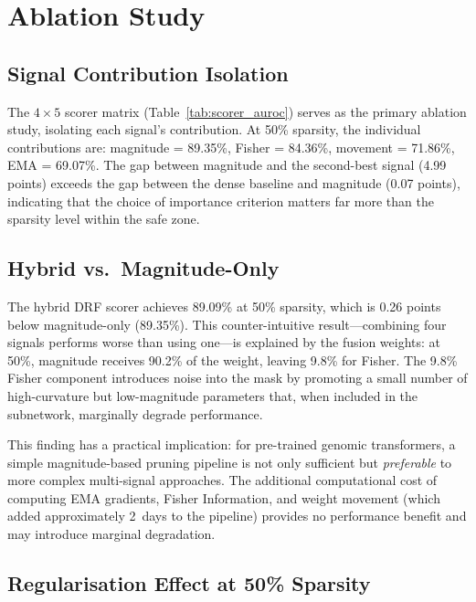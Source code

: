 \documentclass[journal]{IEEEtran}
\begin{document}
\section{Ablation Study}
\label{sec:ablation}

\subsection{Signal Contribution Isolation}

The $4 \times 5$ scorer matrix (Table~\ref{tab:scorer_auroc})
serves as the primary ablation study, isolating each signal's
contribution.
At 50\% sparsity, the individual contributions are:
magnitude = 89.35\%, Fisher = 84.36\%,
movement = 71.86\%, EMA = 69.07\%.
The gap between magnitude and the second-best signal (4.99
points) exceeds the gap between the dense baseline and
magnitude (0.07 points), indicating that the choice of
importance criterion matters far more than the sparsity level
within the safe zone.

\subsection{Hybrid vs.\ Magnitude-Only}

The hybrid DRF scorer achieves 89.09\% at 50\% sparsity,
which is 0.26 points below magnitude-only (89.35\%).
This counter-intuitive result---combining four signals
performs worse than using one---is explained by the fusion
weights: at 50\%, magnitude receives 90.2\% of the weight,
leaving 9.8\% for Fisher.
The 9.8\% Fisher component introduces noise into the mask
by promoting a small number of high-curvature but
low-magnitude parameters that, when included in the
subnetwork, marginally degrade performance.

This finding has a practical implication: for pre-trained
genomic transformers, a simple magnitude-based pruning
pipeline is not only sufficient but \emph{preferable} to
more complex multi-signal approaches.
The additional computational cost of computing EMA gradients,
Fisher Information, and weight movement (which added
approximately 2~days to the pipeline) provides no performance
benefit and may introduce marginal degradation.

\subsection{Regularisation Effect at 50\% Sparsity}
\end{document}
